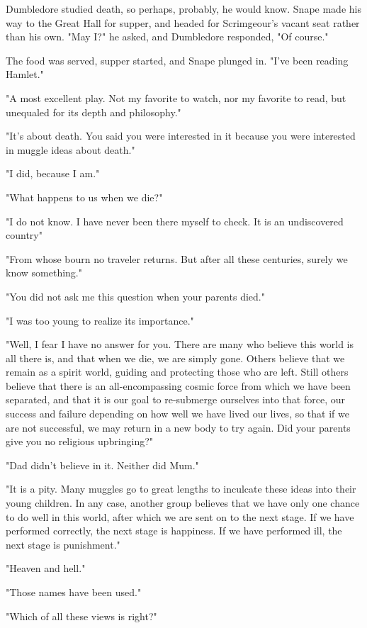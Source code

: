 Dumbledore studied death, so perhaps, probably, he would know. Snape made his way to the Great Hall for supper, and headed for Scrimgeour's vacant seat rather than his own. "May I?" he asked, and Dumbledore responded, "Of course."

The food was served, supper started, and Snape plunged in. "I've been reading Hamlet."

"A most excellent play. Not my favorite to watch, nor my favorite to read, but unequaled for its depth and philosophy."

"It's about death. You said you were interested in it because you were interested in muggle ideas about death."

"I did, because I am."

"What happens to us when we die?"

"I do not know. I have never been there myself to check. It is an undiscovered country{\el}"

"From whose bourn no traveler returns. But after all these centuries, surely we know something."

"You did not ask me this question when your parents died."

"I was too young to realize its importance."

"Well, I fear I have no answer for you. There are many who believe this world is all there is, and that when we die, we are simply gone. Others believe that we remain as a spirit world, guiding and protecting those who are left. Still others believe that there is an all-encompassing cosmic force from which we have been separated, and that it is our goal to re-submerge ourselves into that force, our success and failure depending on how well we have lived our lives, so that if we are not successful, we may return in a new body to try again. Did your parents give you no religious upbringing?"

"Dad didn't believe in it. Neither did Mum."

"It is a pity. Many muggles go to great lengths to inculcate these ideas into their young children. In any case, another group believes that we have only one chance to do well in this world, after which we are sent on to the next stage. If we have performed correctly, the next stage is happiness. If we have performed ill, the next stage is punishment."

"Heaven and hell."

"Those names have been used."

"Which of all these views is right?"

